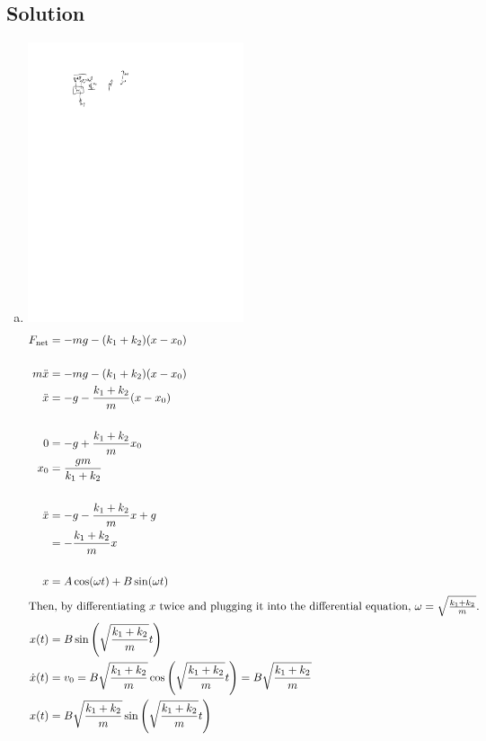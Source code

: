 \documentclass[solutions]{esg8012pset}
\begin{document}
\subsection{Solution}
  \begin{enumerate}[a)]
    \item \includegraphics[width=0.5\textwidth]{2009-10-02_Diagram_5_1}\begin{align*}
     F_{\text{net}} & = -mg -(k_1 + k_2)(x - x_0) \\
     \\
     m\ddot x & = -mg -(k_1 + k_2)(x - x_0) \\
     \ddot x & = -g -\frac{k_1 + k_2}{m}(x - x_0) \\
     \\
     0 & = -g + \frac{k_1 + k_2}{m}x_0 \\
     x_0 & = \frac{gm}{k_1 + k_2} \\
     \\
     \ddot x & = -g - \frac{k_1 + k_2}{m}x + g \\
      & = -\frac{k_1 + k_2}{m}x\\
      \\
      x & = A\cos(\omega t) + B\sin(\omega t) \\
      \intertext{Then, by differentiating $x$ twice and plugging it into the differential equation, $\omega = \sqrt{\frac{k_1 + k_2}{m}}$.}
      x(t) & = B\sin\left(\sqrt{\frac{k_1 + k_2}{m}}t\right) \\
      \dot x(t) & = v_0 = B\sqrt{\frac{k_1 + k_2}{m}}\cos\left(\sqrt{\frac{k_1 + k_2}{m}}t\right) = B\sqrt{\frac{k_1 + k_2}{m}} \\
      x(t) & = B\sqrt{\frac{k_1 + k_2}{m}}\sin\left(\sqrt{\frac{k_1 + k_2}{m}}t\right) \\

\end{align*}
\end{enumerate}
\end{document}
